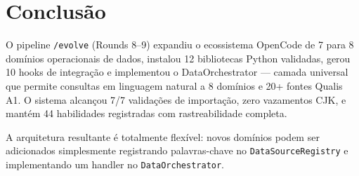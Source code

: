 \documentclass[12pt,a4paper]{article}
\begin{document}
\section{Conclusão}

O pipeline \texttt{/evolve} (Rounds 8--9) expandiu o ecossistema OpenCode de 7 para 8 domínios operacionais de dados, instalou 12 bibliotecas Python validadas, gerou 10 hooks de integração e implementou o DataOrchestrator --- camada universal que permite consultas em linguagem natural a 8 domínios e 20+ fontes Qualis A1. O sistema alcançou 7/7 validações de importação, zero vazamentos CJK, e mantém 44 habilidades registradas com rastreabilidade completa.

A arquitetura resultante é totalmente flexível: novos domínios podem ser adicionados simplesmente registrando palavras-chave no \texttt{DataSourceRegistry} e implementando um handler no \texttt{DataOrchestrator}.
\end{document}
